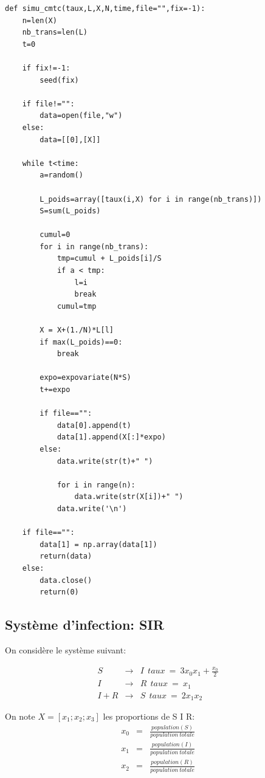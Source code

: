 \documentclass[a4paper]{article}
\begin{document}
\newpage

\begin{lstlisting}[frame=single]
  def simu_cmtc(taux,L,X,N,time,file="",fix=-1):
    n=len(X)
    nb_trans=len(L)
    t=0
    
    if fix!=-1:
        seed(fix)

    if file!="":
        data=open(file,"w")
    else:
        data=[[0],[X]]
        
    while t<time:
        a=random()
        
        L_poids=array([taux(i,X) for i in range(nb_trans)])
        S=sum(L_poids)
        
        cumul=0
        for i in range(nb_trans):
            tmp=cumul + L_poids[i]/S
            if a < tmp:
                l=i
                break
            cumul=tmp
        
        X = X+(1./N)*L[l]
        if max(L_poids)==0:
            break
        
        expo=expovariate(N*S)
        t+=expo

        if file=="":
            data[0].append(t)
            data[1].append(X[:]*expo)
        else:
            data.write(str(t)+" ")
            
            for i in range(n):
                data.write(str(X[i])+" ")
            data.write('\n')
    
    if file=="":
        data[1] = np.array(data[1])
        return(data)
    else:
        data.close()
        return(0)
\end{lstlisting}
\newpage

\subsection{Système d'infection: SIR}
On considère le système suivant:

\begin{eqnarray}
  S & \rightarrow & I \ \ taux \  = \  3x_0x_1+\frac{x_0}{2}\\
  I & \rightarrow & R \ \ taux \ = \ x_1\\
  I+R & \rightarrow & S \ \ taux \ = \ 2x_1x_2 
\end{eqnarray}

On note $X=[x_1;x_2;x_3]$ les proportions de S I R:
\begin{eqnarray*}
  x_0 &=& \frac{population(S)}{population\ totale} \\
  x_1 &=& \frac{population(I)}{population\ totale} \\
  x_2 &=& \frac{population(R)}{population\ totale}
\end{eqnarray*}
\end{document}
